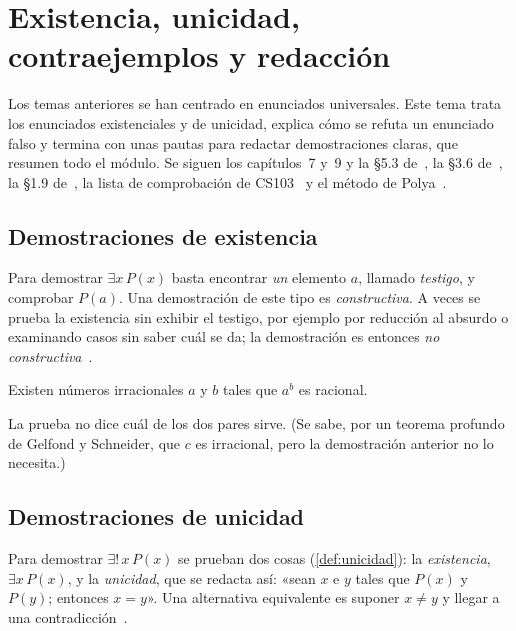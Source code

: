 \chapter{Existencia, unicidad, contraejemplos y redacción}
\label{tema:6}

Los temas anteriores se han centrado en enunciados universales. Este tema trata los enunciados existenciales y de unicidad, explica cómo se refuta un enunciado falso y termina con unas pautas para redactar demostraciones claras, que resumen todo el módulo. Se siguen los capítulos~7 y~9 y la §5.3 de~\cite{hammack}, la §3.6 de~\cite{velleman}, la §1.9 de~\cite{mcs}, la lista de comprobación de CS103~\cite{cs103} y el método de Polya~\cite{polya}.

\section{Demostraciones de existencia}

Para demostrar $\exists x\,P(x)$ basta encontrar \emph{un} elemento $a$, llamado \emph{testigo}, y comprobar $P(a)$. Una demostración de este tipo es \emph{constructiva}. A veces se prueba la existencia sin exhibir el testigo, por ejemplo por reducción al absurdo o examinando casos sin saber cuál se da; la demostración es entonces \emph{no constructiva}~\cite[§7.3–7.4]{hammack}.

\addtocounter{definicion}{1}%

\begin{proposicion}\label{prop:irracional-potencia}
Existen números irracionales $a$ y $b$ tales que $a^{b}$ es racional.
\end{proposicion}

La prueba no dice cuál de los dos pares sirve. (Se sabe, por un teorema profundo de Gelfond y Schneider, que $c$ es irracional, pero la demostración anterior no lo necesita.)

\section{Demostraciones de unicidad}

Para demostrar $\exists!\,x\,P(x)$ se prueban dos cosas (\cref{def:unicidad}): la \emph{existencia}, $\exists x\,P(x)$, y la \emph{unicidad}, que se redacta así: «sean $x$ e $y$ tales que $P(x)$ y $P(y)$; entonces $x=y$». Una alternativa equivalente es suponer $x\neq y$ y llegar a una contradicción~\cite[§3.6]{velleman}.

